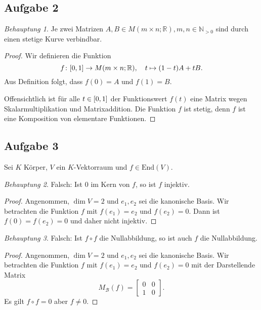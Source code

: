 \documentclass[fleqn,draft,a5paper,12pt]{article}
\theoremstyle{remark}
\newtheorem*{Behauptung}{Behauptung}
\begin{document}
\subsection{Aufgabe 2}
\begin{Behauptung}
  Je zwei Matrizen \(A, B \in M(m \times n; \mathbb{R}), m, n \in \mathbb{N}_{>0}\) sind durch
  einen stetige Kurve verbindbar.
\end{Behauptung}
\begin{proof}
  Wir definieren die Funktion
  \[ f\colon \interval{0}{1} \to M(m \times n; \mathbb{R}), \quad t \mapsto (1-t)A + tB. \]
  Aus Definition folgt, dass \(f(0) = A\) und \(f(1)=B\).

  Offensichtlich ist für alle \(t \in \interval{0}{1}\) der Funktionswert
  \(f(t)\) eine Matrix wegen Skalarmultiplikation und Matrixaddition.
 Die Funktion  \(f\)  ist stetig, denn \(f\) ist eine Komposition von
 elementare Funktionen.
\end{proof}
\subsection{Aufgabe 3}
Sei \(K\) Körper, \(V\) ein \(K\)-Vektorraum und \(f \in \mathrm{End}(V)\).
\begin{Behauptung}
  Falsch: Ist \(0\) im Kern von \(f\), so ist \(f\) injektiv.
\end{Behauptung}
\begin{proof}
  Angenommen, \(\dim V = 2\) und \(e_{1}, e_{2}\) sei die kanonische
  Basis.  Wir betrachten die Funktion \(f\) mit \(f(e_{1})=e_{2}\) und
  \(f(e_{2}) = 0\).  Dann ist \(f(0) = f(e_{2}) = 0\) und daher nicht injektiv.
\end{proof}
\begin{Behauptung}
  Falsch: Ist \(f \circ f\) die Nullabbildung, so ist auch \(f\) die Nullabbildung.
\end{Behauptung}
\begin{proof}
  Angenommen, \(\dim V = 2\) und \(e_{1}, e_{2}\) sei die kanonische
  Basis. Wir betrachten die Funktion \(f\) mit \(f(e_{1})=e_{2}\) und
  \(f(e_{2}) = 0\) mit der Darstellende Matrix
  \[
    M_{\mathcal{B}}(f) =
    \begin{bmatrix}
      0 & 0 \\ 1 & 0
    \end{bmatrix}.
  \]
  Es gilt \(f \circ f = 0\) aber \(f \ne 0\).
\end{proof}
\end{document}
